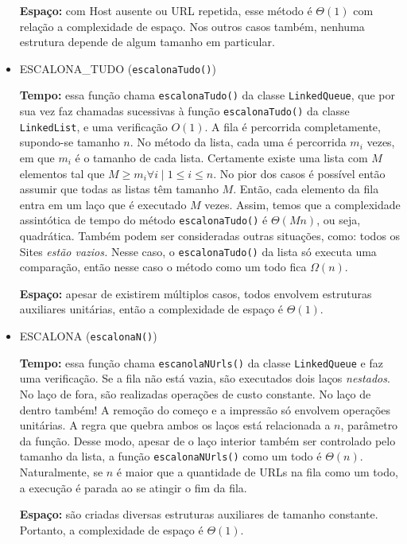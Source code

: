 \documentclass{article}
\def\code#1{\texttt{#1}}
\begin{document}
\begin{itemize}
        \textbf{Espaço:} com Host ausente ou URL repetida, esse método é \( \Theta(1) \) com relação a complexidade de espaço. Nos outros casos também, nenhuma estrutura depende de algum tamanho em particular.

    \item ESCALONA\_TUDO (\code{escalonaTudo()})

        \textbf{Tempo:} essa função chama \code{escalonaTudo()} da classe \code{LinkedQueue}, que por sua vez faz chamadas sucessivas à função \code{escalonaTudo()} da classe \code{LinkedList}, e uma verificação \( O(1) \). A fila é percorrida completamente, supondo-se tamanho \( n \). No método da lista, cada uma é percorrida \( m_i \) vezes, em que \( m_i \) é o tamanho de cada lista. Certamente existe uma lista com \( M \) elementos tal que \( M \geq m_i \forall i \mid 1 \leq i \leq n \). No pior dos casos é possível então assumir que todas as listas têm tamanho \( M \). Então, cada elemento da fila entra em um laço que é executado \( M \) vezes. Assim, temos que a complexidade assintótica de tempo do método \code{escalonaTudo()} é \( \Theta(Mn) \), ou seja, quadrática. Também podem ser consideradas outras situações, como: todos os Sites \textit{estão vazios.} Nesse caso, o \code{escalonaTudo()} da lista só executa uma comparação, então nesse caso o método como um todo fica \( \Omega(n) \).

        \textbf{Espaço:} apesar de existirem múltiplos casos, todos envolvem estruturas auxiliares unitárias, então a complexidade de espaço é \( \Theta(1) \).

    \item ESCALONA (\code{escalonaN()})

        \textbf{Tempo:} essa função chama \code{escanolaNUrls()} da classe \code{LinkedQueue} e faz uma verificação. Se a fila não está vazia, são executados dois laços \textit{nestados}. No laço de fora, são realizadas operações de custo constante. No laço de dentro também! A remoção do começo e a impressão só envolvem operações unitárias. A regra que quebra ambos os laços está relacionada a \( n \), parâmetro da função. Desse modo, apesar de o laço interior também ser controlado pelo tamanho da lista, a função \code{escalonaNUrls()} como um todo é \( \Theta(n) \). Naturalmente, se \( n \) é maior que a quantidade de URLs na fila como um todo, a execução é parada ao se atingir o fim da fila.

        \textbf{Espaço:} são criadas diversas estruturas auxiliares de tamanho constante. Portanto, a complexidade de espaço é \( \Theta(1) \).


\end{itemize}
\end{document}
